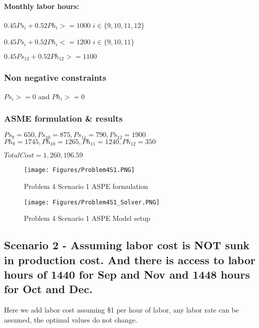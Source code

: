 \documentclass[]{article}
\let\oldparagraph\paragraph
\renewcommand{\paragraph}[1]{\oldparagraph{#1}\mbox{}}
\begin{document}
\paragraph{Monthly labor hours:}\label{monthly-labor-hours}

\(0.45Ps_{i} + 0.52Ph_{i} >= 1000\) \(i \in \{9,10,11,12\}\)

\(0.45Ps_{i} + 0.52Ph_{i} <= 1200\) \(i \in \{9,10,11\}\)

\(0.45Ps_{12} + 0.52Ph_{12} >= 1100\)

\subsubsection{Non negative constraints}\label{non-negative-constraints}

\(Ps_{i} >= 0\) and \(Ph_{i} >= 0\)

\subsubsection{ASME formulation \&
results}\label{asme-formulation-results}

\(Ps_{9} = 650, Ps_{10} = 875, Ps_{11} = 790, Ps_{12} = 1900\)
\(Ph_{9} = 1745, Ph_{10} = 1265, Ph_{11} = 1240, Ph_{12} = 350\)

\(Total Cost = 1,260,196.59\)

\begin{figure}
\centering
\texttt{[image: Figures/Problem4S1.PNG]}
\caption{Problem 4 Scenario 1 ASPE formulation}
\end{figure}

\begin{figure}
\centering
\texttt{[image: Figures/Problem4S1\_Solver.PNG]}
\caption{Problem 4 Scenario 1 ASPE Model setup}
\end{figure}

\pagebreak

\subsection{Scenario 2 - Assuming labor cost is NOT sunk in production
cost. And there is access to labor hours of 1440 for Sep and Nov and
1448 hours for Oct and
Dec.}\label{scenario-2---assuming-labor-cost-is-not-sunk-in-production-cost.-and-there-is-access-to-labor-hours-of-1440-for-sep-and-nov-and-1448-hours-for-oct-and-dec.}

Here we add labor cost assuming \$1 per hour of labor, any labor rate
can be assumed, the optimal values do not change.
\end{document}
